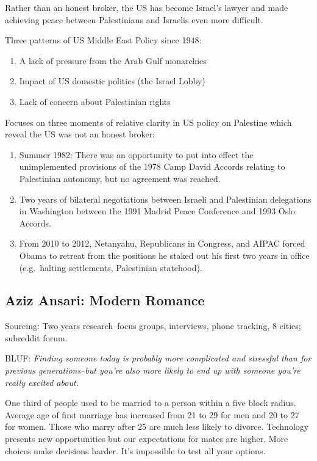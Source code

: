 \documentclass[
]{article}
\begin{document}
Rather than an honest broker, the US has become Israel's lawyer and made
achieving peace between Palestinians and Israelis even more difficult.

Three patterns of US Middle East Policy since 1948:

\begin{enumerate}
\def\labelenumi{\arabic{enumi}.}
\item
  A lack of pressure from the Arab Gulf monarchies
\item
  Impact of US domestic politics (the Israel Lobby)
\item
  Lack of concern about Palestinian rights
\end{enumerate}

Focuses on three moments of relative clarity in US policy on Palestine
which reveal the US was not an honest broker:

\begin{enumerate}
\def\labelenumi{\arabic{enumi}.}
\item
  Summer 1982: There was an opportunity to put into effect the
  unimplemented provisions of the 1978 Camp David Accords relating to
  Palestinian autonomy, but no agreement was reached.
\item
  Two years of bilateral negotiations between Israeli and Palestinian
  delegations in Washington between the 1991 Madrid Peace Conference and
  1993 Oslo Accords.
\item
  From 2010 to 2012, Netanyahu, Republicans in Congress, and AIPAC
  forced Obama to retreat from the positions he staked out his first two
  years in office (e.g.~halting settlements, Palestinian statehood).
\end{enumerate}

\hypertarget{aziz-ansari-modern-romance}{%
\subsection{Aziz Ansari: Modern
Romance}\label{aziz-ansari-modern-romance}}

Sourcing: Two years research--focus groups, interviews, phone tracking,
8 cities; subreddit forum.

BLUF: \emph{Finding someone today is probably more complicated and
stressful than for previous generations--but you're also more likely to
end up with someone you're really excited about.}

One third of people used to be married to a person within a five block
radius. Average age of first marriage has increased from 21 to 29 for
men and 20 to 27 for women. Those who marry after 25 are much less
likely to divorce. Technology presents new opportunities but our
expectations for mates are higher. More choices make decisions harder.
It's impossible to test all your options.
\end{document}
